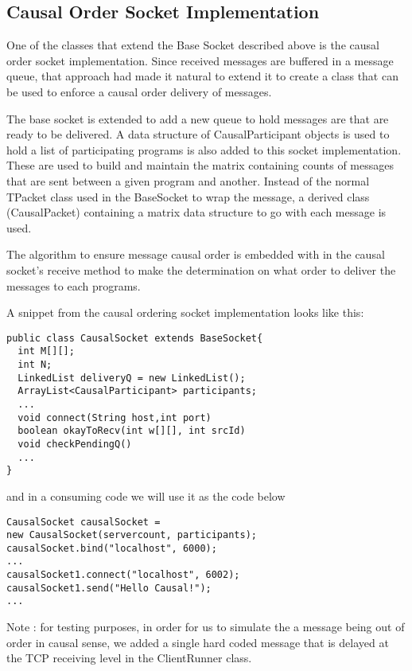\documentclass[11pt,journal,compsoc]{IEEEtran}
\begin{document}
\subsection{Causal Order Socket Implementation}
One of the classes that extend the Base Socket described above is the causal order socket implementation. Since received messages are buffered in a message queue, that approach had made it natural to extend it to create a class that can be used to enforce a causal order delivery of messages.

The base socket is extended to add a new queue to hold messages are that are ready to be delivered. A data structure of CausalParticipant objects is used to hold a list of participating programs is also added to this socket implementation. These are used to build and maintain the matrix containing counts of messages that are sent between a given program and another. Instead of the normal TPacket class used in the BaseSocket to wrap the message, a derived class (CausalPacket) containing  a matrix data structure to go with each message is used.

The algorithm to ensure message causal order is embedded with in the causal socket's receive method to make the determination on what order to deliver the messages to each programs.

A snippet from the causal ordering socket implementation looks like this:

\begin{lstlisting}
public class CausalSocket extends BaseSocket{
  int M[][];
  int N;
  LinkedList deliveryQ = new LinkedList();
  ArrayList<CausalParticipant> participants;
  ...
  void connect(String host,int port)
  boolean okayToRecv(int w[][], int srcId)
  void checkPendingQ()
  ...
}
\end{lstlisting}

and in a consuming code we will use it as the code below

\begin{lstlisting}
CausalSocket causalSocket = 
new CausalSocket(servercount, participants);
causalSocket.bind("localhost", 6000);
...
causalSocket1.connect("localhost", 6002);
causalSocket1.send("Hello Causal!");
...

\end{lstlisting}

Note : for testing purposes, in order for us to simulate the a message being out of order in causal sense, we added a single hard coded message that is delayed at the TCP receiving level in the ClientRunner class.
\end{document}
